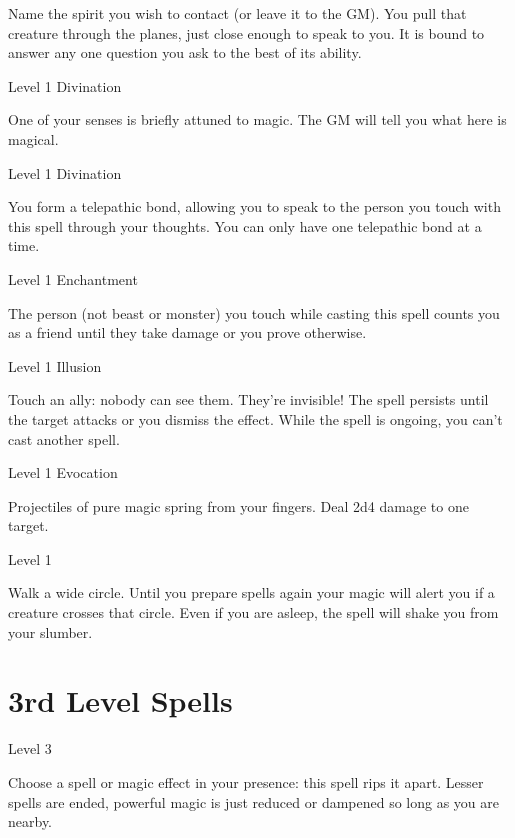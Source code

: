 Name the spirit you wish to contact (or leave it to the GM). You pull that creature through the planes, just close enough to speak to you. It is bound to answer any one question you ask to the best of its ability.

 
\startSpellName
{} 	Level 1	Divination
\stopSpellName
 

One of your senses is briefly attuned to magic. The GM will tell you what here is magical.

 
\startSpellName
{} 	Level 1	Divination
\stopSpellName
 

You form a telepathic bond, allowing you to speak to the person you touch with this spell through your thoughts. You can only have one telepathic bond at a time.

 
\startSpellName
{} 	Level 1	Enchantment
\stopSpellName
 

The person (not beast or monster) you touch while casting this spell counts you as a friend until they take damage or you prove otherwise.

 
\startSpellName
{} 	Level 1	Illusion
\stopSpellName
 

Touch an ally: nobody can see them. They're invisible! The spell persists until the target attacks or you dismiss the effect. While the spell is ongoing, you can't cast another spell.

 
\startSpellName
{} 	Level 1	Evocation
\stopSpellName
 

Projectiles of pure magic spring from your fingers. Deal 2d4 damage to one target.

 
\startSpellName
{} 	Level 1
\stopSpellName
 

Walk a wide circle. Until you prepare spells again your magic will alert you if a creature crosses that circle. Even if you are asleep, the spell will shake you from your slumber.



 


\section{3rd Level Spells}     
 
\startSpellName
{} 	Level 3
\stopSpellName
 

Choose a spell or magic effect in your presence: this spell rips it apart. Lesser spells are ended, powerful magic is just reduced or dampened so long as you are nearby.

